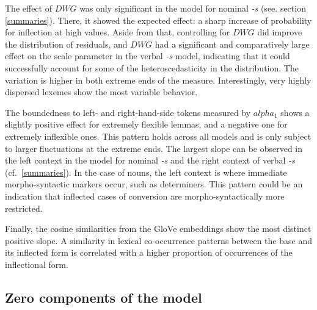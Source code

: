 \documentclass[
]{article}
\begin{document}
The effect of \(DWG\) was only significant in the model for nominal
\emph{-s} (see. section \ref{summaries}). There, it showed the expected
effect: a sharp increase of probability for inflection at high values.
Aside from that, controlling for \(DWG\) did improve the distribution of
residuals, and \(DWG\) had a significant and comparatively large effect
on the scale parameter in the verbal \emph{-s} model, indicating that it
could successfully account for some of the heteroscedasticity in the
distribution. The variation is higher in both extreme ends of the
measure. Interestingly, very highly dispersed lexemes show the most
variable behavior.

The boundedness to left- and right-hand-side tokens measured by
\(alpha_{1}\) shows a slightly positive effect for extremely flexible
lemmas, and a negative one for extremely inflexible ones. This pattern
holds across all models and is only subject to larger fluctuations at
the extreme ends. The largest slope can be observed in the left context
in the model for nominal \emph{-s} and the right context of verbal
\emph{-s} (cf.~\ref{summaries}). In the case of nouns, the left context
is where immediate morpho-syntactic markers occur, such as determiners.
This pattern could be an indication that inflected cases of conversion
are morpho-syntactically more restricted.

Finally, the cosine similarities from the GloVe embeddings show the most
distinct positive slope. A similarity in lexical co-occurrence patterns
between the base and its inflected form is correlated with a higher
proportion of occurrences of the inflectional form.

\hypertarget{zero-components-of-the-model}{%
\subsection{Zero components of the
model}\label{zero-components-of-the-model}}
\end{document}
